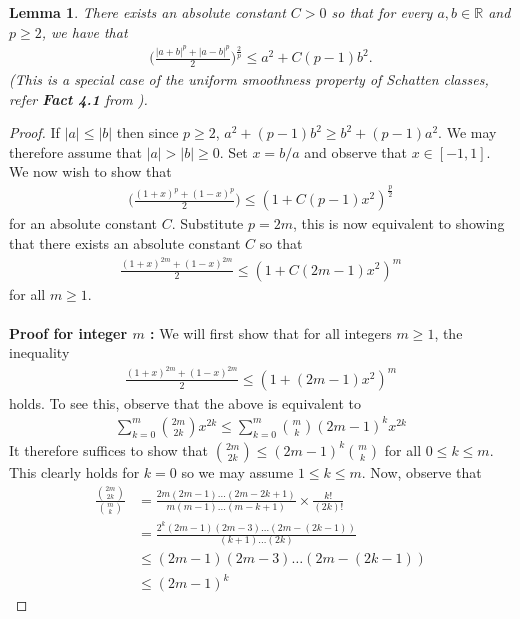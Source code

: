 \documentclass[11pt, reqno,english]{amsart}
\newtheorem{lemma}{Lemma}[section]
\begin{document}
\begin{lemma}\label{uniformconvexity1}
There exists an absolute constant $C>0$ so that for every $a, b \in \mathbb{R}$ and $p \geq 2$, we have that
\begin{align*}
\bigg(\frac{|a + b|^p + |a-b|^p}{2}\bigg)^{\frac{2}{p}} \leq a^2 + C(p-1)b^2.
\end{align*}
(This is a special case of the uniform smoothness property of Schatten classes, refer \textbf{Fact 4.1} from \cite{huang2022matrix}).  
\end{lemma}
\begin{proof}
If $|a| \leq |b|$ then since $p \geq 2$, $a^2 + (p-1)b^2 \geq b^2 + (p-1)a^2$. We may therefore assume that $|a| > |b| \geq 0$. Set $x = b/a$ and observe that $x \in [-1,1]$. We now wish to show that
\begin{align*}
\bigg(\frac{(1 + x)^p + (1 - x)^p}{2}\bigg) \leq (1 + C(p-1)x^2)^{\frac{p}{2}}
\end{align*}
for an absolute constant $C$. Substitute $p = 2m$, this is now equivalent to showing that there exists an absolute constant $C$ so that
\begin{align*}
\frac{(1 + x)^{2m} + (1 - x)^{2m}}{2} \leq (1 + C(2m-1)x^2)^m
\end{align*}
for all $m \geq 1$. 
\\\\
\textbf{Proof for integer $m$ :}
We will first show that for all integers $m \geq 1$, the inequality
\begin{align*}
\frac{(1 + x)^{2m} + (1-x)^{2m}}{2} \leq (1 + (2m-1)x^2)^m
\end{align*}
holds. To see this, observe that the above is equivalent to
\begin{align*}
\sum_{k = 0}^{m}\binom{2m}{2k}x^{2k} \leq \sum_{k = 0}^m \binom{m}{k} (2m-1)^k x^{2k}
\end{align*}
It therefore suffices to show that $\binom{2m}{2k} \leq (2m-1)^k \binom{m}{k}$ for all $0 \leq k \leq m$. This clearly holds for $k = 0$ so we may assume $1 \leq k \leq m$. Now, observe that
\begin{align*}
\frac{\binom{2m}{2k}}{\binom{m}{k}} &= \frac{2m (2m-1) \dots (2m - 2k + 1)}{m (m-1) \dots (m - k + 1)} \times \frac{k!}{(2k)!}
\\
&= \frac{2^k (2m - 1)(2m - 3)\dots (2m - (2k-1))}{(k+1)\dots (2k)}
\\
&\leq (2m - 1)(2m - 3) \dots (2m - (2k - 1))
\\
&\leq (2m - 1)^k
\end{align*}

\end{proof}
\end{document}
